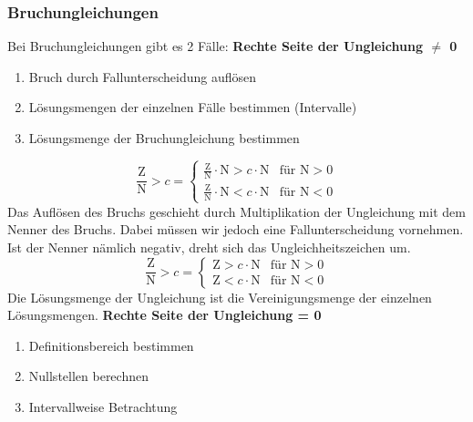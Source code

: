 \begin{multicols*}{3}
    \subsubsection*{Bruchungleichungen}
    Bei Bruchungleichungen gibt es 2 Fälle:
    \textbf{Rechte Seite der Ungleichung $\neq$ 0}
    \begin{enumerate}
        \item Bruch durch Fallunterscheidung auflösen
        \item Lösungsmengen der einzelnen Fälle bestimmen (Intervalle)
        \item Lösungsmenge der Bruchungleichung bestimmen
    \end{enumerate}
    \begin{equation*} \frac{\text{Z}}{\text{N}} > c = \begin{cases} \frac{\text{Z}}{\text{N}} \cdot \text{N} > c \cdot \text{N} &\text{für } \text{N} > 0 \\[5px] \frac{\text{Z}}{\text{N}} \cdot \text{N} < c \cdot \text{N} &\text{für } \text{N} < 0 \end{cases} \end{equation*}
    Das Auflösen des Bruchs geschieht durch Multiplikation der Ungleichung mit dem Nenner des Bruchs. Dabei müssen wir jedoch eine Fallunterscheidung vornehmen. Ist der Nenner nämlich negativ, dreht sich das Ungleichheitszeichen um.
    \begin{equation*} \frac{\text{Z}}{\text{N}} > c = \begin{cases} \text{Z} > c \cdot \text{N} &\text{für } \text{N} > 0 \\[5px] \text{Z} < c \cdot \text{N} &\text{für } \text{N} < 0 \end{cases} \end{equation*}
    Die Lösungsmenge der Ungleichung ist die Vereinigungsmenge der einzelnen Lösungsmengen.
    \textbf{Rechte Seite der Ungleichung = 0}
    \begin{enumerate}
        \item Definitionsbereich bestimmen
        \item Nullstellen berechnen
        \item Intervallweise Betrachtung
    \end{enumerate}
\end{multicols*}
